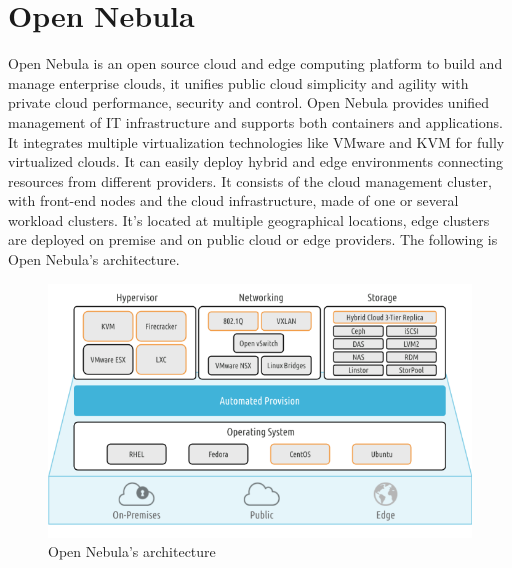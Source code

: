 \section{Open Nebula}
Open Nebula is an open source cloud and edge computing platform to build and manage enterprise clouds, it unifies public cloud simplicity and agility with private cloud performance, security and control. \n
Open Nebula provides unified management of IT infrastructure and supports both containers and applications. It integrates multiple virtualization technologies like VMware and KVM for fully virtualized clouds. It can easily deploy hybrid and edge environments connecting resources from different providers. \n
It consists of the cloud management cluster, with front-end nodes and the cloud infrastructure, made of one or several workload clusters. It's located at multiple geographical locations, edge clusters are deployed on premise and on public cloud or edge providers. The following is Open Nebula's architecture.
\begin{figure}
    \centering
    \includegraphics[scale=0.6]{Images/Open_Nebula.png}
    \caption{Open Nebula's architecture}
\end{figure}
